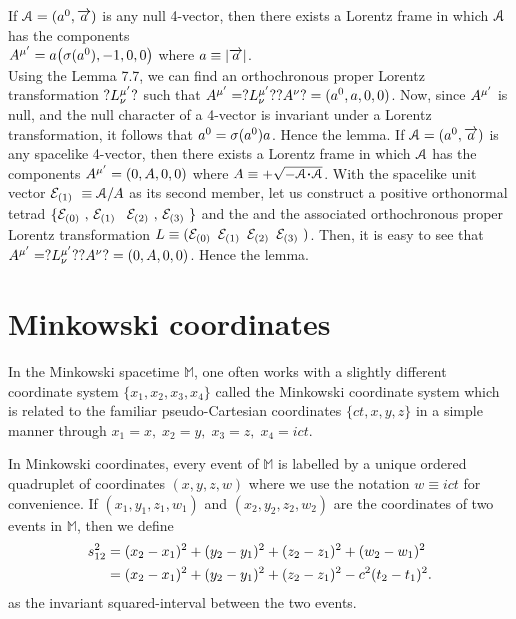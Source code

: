 If $\EuScript{A} =(a^0,\overrightarrow{a})$ is any null 
4-vector, 
then there exists a Lorentz frame in which 
$\EuScript{A}$ has the components\\ 
$A^{{\mu}'} =a\big({\sigma}(a^0),-1,0,0\big)$ 
where $a\equiv |\overrightarrow{a}|$.\\
\prf  Using the  Lemma 7.7, we can find an   
orthochronous proper Lorentz transformation $ 
?L^{{\mu}'}_\nu?$ such that $A^{{\mu}'}= ?L^{{\mu}'}_\nu? 
?A^\nu? =(a^0,a,0,0) $. Now, since $A^{{\mu}'}$ is 
null, 
and the null character of a 4-vector is invariant 
under 
a Lorentz transformation, it follows that $ a^0 = 
{\sigma}(a^0)a $. Hence the lemma.
If $\EuScript{A} =(a^0,\overrightarrow{a})$ is any spacelike 
4-vector, then there exists a Lorentz frame in which 
$\EuScript{A}$ has the components  $A^{{\mu}'} 
=(0,A,0,0) $ where  $A \equiv +\sqrt{- \EuScript{A} 
\dotp\EuScript{A}}$. \prf  With the spacelike unit 
vector $\mathcal{E}_{ {({1})}\ } \equiv \EuScript{A}/A$ as its second 
member, let us construct a positive orthonormal tetrad 
$\{\mathcal{E}_{ {({0})}\ }, \,\mathcal{E}_{ {({1})}\ }$  $\mathcal{E}_{ {({2})}\ }, \,\mathcal{E}_{ {({3})}\ }\} $ and the and the 
associated orthochronous proper Lorentz transformation 
$L\equiv (\dnot \,\dwon\,\dtwo \,\break \dtri)$. Then, it is 
easy to see that  $A^{{\mu}'} =?L^{{\mu}'}_\nu? ?A^\nu? 
=(0,A,0,0)$. Hence the lemma.

\section{Minkowski coordinates}
In the Minkowski spacetime $\mathbb{M}$, one often 
works with a slightly different coordinate system 
$\{x_1,x_2,x_3,x_4\}$ called the Minkowski coordinate 
system which is related to the familiar 
pseudo-Carte\break sian coordinates $\{ct,x,y,z\}$ in a  
simple manner through $x_1=x,\;x_2=y,\;x_3=z,\; 
x_4=ict$.

In Minkowski coordinates, every event of $\mathbb{M}$ 
is  labelled by a unique ordered quadruplet of  
coordinates $ (x,y,z,w) $ where we use the notation $ 
w 
\equiv ict $ for convenience. If $ (x_1,y_1,z_1,w_1) $ 
and $ (x_2,y_2,z_2,w_2) $ are the coordinates of two 
events in $ \mathbb{M}$, then we define
\begin{align}\label{geom.16}
s_{12}^2&=(x_2-x_1)^2+(y_2-y_1)^2+(z_2-z_1)^2+(w_2 
-w_1)^2\notag\\& 
=(x_2-x_1)^2+(y_2-y_1)^2+(z_2-z_1)^2-c^2(t_2-t_1)^2.
\end{align}
as the invariant squared-interval between the two 
events.

